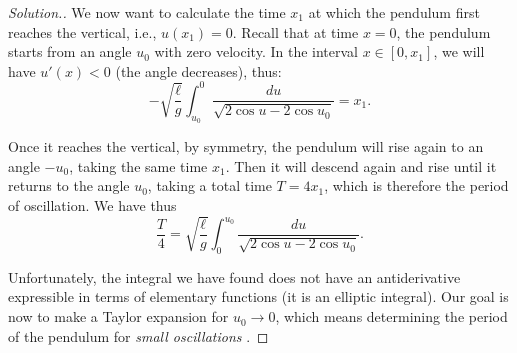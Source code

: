 \begin{proof}[Solution.]
We now want to calculate the time $x_1$ at which the pendulum first reaches the
vertical, i.e., $u(x_1)=0$.
Recall that at time $x=0$, the pendulum starts from an angle $u_0$ with zero
velocity. In the interval $x\in[0,x_1]$, we will have $u'(x)<0$ (the angle
decreases), thus:
\[
-\sqrt{\frac{\ell}{g}}\int_{u_0}^{0} \frac{du}{\sqrt{2\cos u - 2\cos u_0}}
= x_1.
\]

Once it reaches the vertical, by symmetry, the pendulum will rise again to an
angle $-u_0$, taking the same time $x_1$. Then it will descend again and rise
until it returns to the angle $u_0$, taking a total time $T=4x_1$, which is
therefore the period of oscillation. We have thus
\[
  \frac{T}{4} = \sqrt{\frac \ell g}\int_0^{u_0} \frac{du}{\sqrt{2\cos u - 2\cos u_0}}.
\]

Unfortunately, the integral we have found does not have an antiderivative
expressible in terms of elementary functions (it is an elliptic integral).
Our goal is now to make a Taylor expansion for $u_0\to 0$, which means
determining the period of the pendulum for \emph{small oscillations}%
.


\end{proof}
